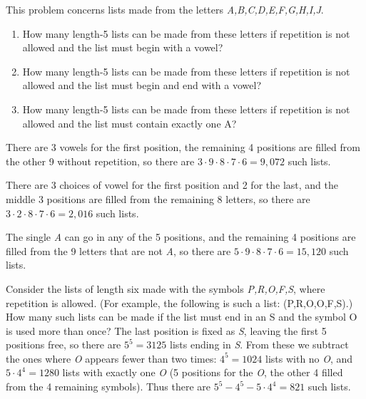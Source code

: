 \documentclass[DIN, pagenumber=false, fontsize=11pt, parskip=half]{scrartcl}
\begin{document}
\begin{problems}
    \problem This problem concerns lists made from the letters \textit{A,\allowbreak B,\allowbreak C,\allowbreak D,\allowbreak E,\allowbreak F,\allowbreak G,\allowbreak H,\allowbreak I,\allowbreak J}.
    \begin{enumerate}[label=\alph*)]
        \item How many length-5 lists can be made from these letters if repetition is not allowed and the list must begin with a vowel?
        \item How many length-5 lists can be made from these letters if repetition is not allowed and the list must begin and end with a vowel?
        \item How many length-5 lists can be made from these letters if repetition is not allowed and the list must contain exactly one A?
    \end{enumerate}
    \answer
    \begin{parts}
        \item There are 3 vowels for the first position, the remaining 4 positions are filled from the other 9 without repetition, so there are $3 \cdot 9 \cdot 8 \cdot 7 \cdot 6 = 9,072$ such lists.
        \item There are 3 choices of vowel for the first position and 2 for the last, and the middle 3 positions are filled from the remaining 8 letters, so there are $3 \cdot 2 \cdot 8 \cdot 7 \cdot 6 = 2,016$ such lists.
        \item The single \textit{A} can go in any of the 5 positions, and the remaining 4 positions are filled from the 9 letters that are not \textit{A}, so there are $5 \cdot 9 \cdot 8 \cdot 7 \cdot 6 = 15,120$ such lists.
    \end{parts}

    \problem Consider the lists of length six made with the symbols \textit{P,R,O,F,S}, where repetition is allowed. (For example, the following is such a list: (P,R,O,O,F,S).) How many such lists can be made if the list must end in an S and the symbol O is used more than once?
    \answer The last position is fixed as \textit{S}, leaving the first 5 positions free, so there are $5^5 = 3125$ lists ending in \textit{S}. From these we subtract the ones where \textit{O} appears fewer than two times: $4^5 = 1024$ lists with no \textit{O}, and $5 \cdot 4^4 = 1280$ lists with exactly one \textit{O} (5 positions for the \textit{O}, the other 4 filled from the 4 remaining symbols). Thus there are $5^5 - 4^5 - 5 \cdot 4^4 = 821$ such lists.

\end{problems}
\end{document}
